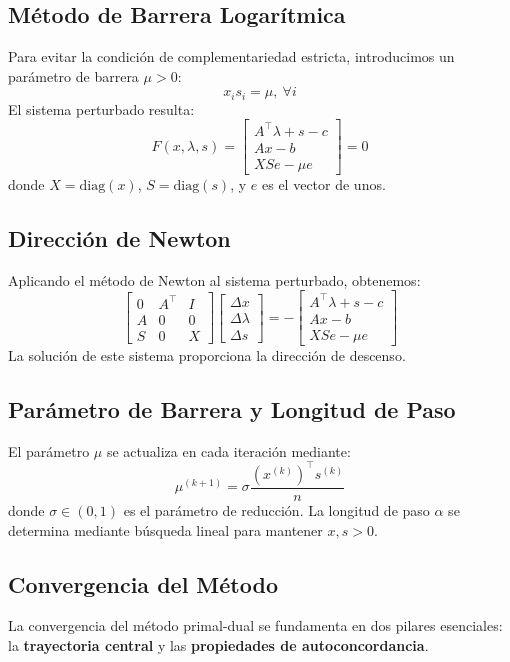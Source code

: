 \documentclass{article}
\begin{document}
\subsection{Método de Barrera Logarítmica}
Para evitar la condición de complementariedad estricta, introducimos un parámetro de barrera $\mu > 0$:
\[
x_i s_i = \mu,\ \forall i
\]
El sistema perturbado resulta:
\[
F(x, \lambda, s) = \begin{bmatrix}
A^\top \lambda + s - c \\
Ax - b \\
XSe - \mu e
\end{bmatrix} = 0
\]
donde $X = \text{diag}(x)$, $S = \text{diag}(s)$, y $e$ es el vector de unos.

\subsection{Dirección de Newton}
Aplicando el método de Newton al sistema perturbado, obtenemos:
\[
\begin{bmatrix}
0 & A^\top & I \\
A & 0 & 0 \\
S & 0 & X
\end{bmatrix}
\begin{bmatrix}
\Delta x \\
\Delta \lambda \\
\Delta s
\end{bmatrix}
=
-
\begin{bmatrix}
A^\top \lambda + s - c \\
Ax - b \\
XSe - \mu e
\end{bmatrix}
\]
La solución de este sistema proporciona la dirección de descenso.

\subsection{Parámetro de Barrera y Longitud de Paso}
El parámetro $\mu$ se actualiza en cada iteración mediante:
\[
\mu^{(k+1)} = \sigma \frac{(x^{(k)})^\top s^{(k)}}{n}
\]
donde $\sigma \in (0,1)$ es el parámetro de reducción. La longitud de paso $\alpha$ se determina mediante búsqueda lineal para mantener $x,s > 0$.

\subsection{Convergencia del Método}
La convergencia del método primal-dual se fundamenta en dos pilares esenciales: la \textbf{trayectoria central} y las \textbf{propiedades de autoconcordancia}. 
\end{document}

